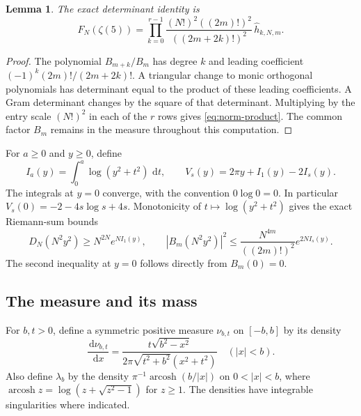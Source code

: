 \documentclass[11pt,letterpaper]{article}
\newtheorem{lemma}[lemma]{Lemma}
\theoremstyle{definition}
\newcommand{\dd}{\,\mathrm d}
\DeclareMathOperator{\arcosh}{arcosh}
\begin{document}
\begin{lemma}\label{lem:norm-product}
The exact determinant identity is
\begin{equation}\label{eq:norm-product}
 F_N(\zeta(5))=
 \prod_{k=0}^{r-1}
 \frac{(N!)^2((2m)!)^2}{((2m+2k)!)^2}\,
 \widehat h_{k,N,m}.
\end{equation}
\end{lemma}
\begin{proof}
The polynomial $B_{m+k}/B_m$ has degree $k$ and leading coefficient
$(-1)^k(2m)!/(2m+2k)!$. A triangular change to monic orthogonal polynomials
has determinant equal to the product of these leading coefficients.
A Gram determinant changes by the square of that determinant.
Multiplying by the entry scale $(N!)^2$ in each of the $r$ rows gives
\eqref{eq:norm-product}. The common factor $B_m$ remains in the measure
throughout this computation.
\end{proof}

For $a\ge0$ and $y\ge0$, define
\begin{equation}\label{eq:external-field}
 I_a(y)=\int_0^a\log(y^2+t^2)\,\dd t,\qquad
 V_s(y)=2\pi y+I_1(y)-2I_s(y).
\end{equation}
The integrals at $y=0$ converge, with the convention $0\log0=0$.
In particular $V_s(0)=-2-4s\log s+4s$.
Monotonicity of $t\mapsto\log(y^2+t^2)$ gives the exact Riemann-sum bounds
\begin{equation}\label{eq:riemann-weight}
 D_N(N^2y^2)\ge N^{2N}e^{NI_1(y)},\qquad
 |B_m(N^2y^2)|^2
 \le\frac{N^{4m}}{((2m)!)^2}e^{2NI_s(y)}.
\end{equation}
The second inequality at $y=0$ follows directly from $B_m(0)=0$.

\subsection{The measure and its mass}
For $b,t>0$, define a symmetric positive measure $\nu_{b,t}$ on $[-b,b]$
by its density
\begin{equation}\label{eq:nu-density}
 \frac{\dd\nu_{b,t}}{\dd x}
 =\frac{t\sqrt{b^2-x^2}}
 {2\pi\sqrt{t^2+b^2}(x^2+t^2)}
 \quad (|x|<b).
\end{equation}
Also define $\lambda_b$ by the density
$\pi^{-1}\arcosh(b/|x|)$ on $0<|x|<b$, where
$\arcosh z=\log(z+\sqrt{z^2-1})$ for $z\ge1$.
The densities have integrable singularities where indicated.
\end{document}

